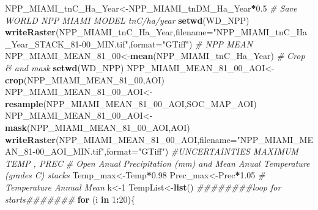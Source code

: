 \documentclass[
  10pt,
  b5paper,
]{book}
\newenvironment{Shaded}{\begin{snugshade}}{\end{snugshade}}
\newcommand{\CommentTok}[1]{\textcolor[rgb]{0.56,0.35,0.01}{\textit{#1}}}
\newcommand{\ControlFlowTok}[1]{\textcolor[rgb]{0.13,0.29,0.53}{\textbf{#1}}}
\newcommand{\DataTypeTok}[1]{\textcolor[rgb]{0.13,0.29,0.53}{#1}}
\newcommand{\DecValTok}[1]{\textcolor[rgb]{0.00,0.00,0.81}{#1}}
\newcommand{\FloatTok}[1]{\textcolor[rgb]{0.00,0.00,0.81}{#1}}
\newcommand{\KeywordTok}[1]{\textcolor[rgb]{0.13,0.29,0.53}{\textbf{#1}}}
\newcommand{\NormalTok}[1]{#1}
\newcommand{\OperatorTok}[1]{\textcolor[rgb]{0.81,0.36,0.00}{\textbf{#1}}}
\newcommand{\StringTok}[1]{\textcolor[rgb]{0.31,0.60,0.02}{#1}}
\begin{document}
\begin{Shaded}
\begin{Highlighting}[]
\NormalTok{NPP_MIAMI_tnC_Ha_Year<-NPP_MIAMI_tnDM_Ha_Year}\OperatorTok{*}\FloatTok{0.5}
\CommentTok{# Save WORLD NPP MIAMI MODEL tnC/ha/year}
\KeywordTok{setwd}\NormalTok{(WD_NPP)}
\KeywordTok{writeRaster}\NormalTok{(NPP_MIAMI_tnC_Ha_Year,}\DataTypeTok{filename=}\StringTok{"NPP_MIAMI_tnC_Ha_Year_STACK_81-00_MIN.tif"}\NormalTok{,}\DataTypeTok{format=}\StringTok{"GTiff"}\NormalTok{)}
\CommentTok{# NPP MEAN}
\NormalTok{NPP_MIAMI_MEAN_}\DecValTok{81}\NormalTok{_}\DecValTok{00}\NormalTok{<-}\KeywordTok{mean}\NormalTok{(NPP_MIAMI_tnC_Ha_Year)}
\CommentTok{# Crop & and mask}
\KeywordTok{setwd}\NormalTok{(WD_NPP)}
\NormalTok{NPP_MIAMI_MEAN_}\DecValTok{81}\NormalTok{_}\DecValTok{00}\NormalTok{_AOI<-}\KeywordTok{crop}\NormalTok{(NPP_MIAMI_MEAN_}\DecValTok{81}\NormalTok{_}\DecValTok{00}\NormalTok{,AOI)}
\NormalTok{NPP_MIAMI_MEAN_}\DecValTok{81}\NormalTok{_}\DecValTok{00}\NormalTok{_AOI<-}\KeywordTok{resample}\NormalTok{(NPP_MIAMI_MEAN_}\DecValTok{81}\NormalTok{_}\DecValTok{00}\NormalTok{_AOI,SOC_MAP_AOI)}
\NormalTok{NPP_MIAMI_MEAN_}\DecValTok{81}\NormalTok{_}\DecValTok{00}\NormalTok{_AOI<-}\KeywordTok{mask}\NormalTok{(NPP_MIAMI_MEAN_}\DecValTok{81}\NormalTok{_}\DecValTok{00}\NormalTok{_AOI,AOI)}
\KeywordTok{writeRaster}\NormalTok{(NPP_MIAMI_MEAN_}\DecValTok{81}\NormalTok{_}\DecValTok{00}\NormalTok{_AOI,}\DataTypeTok{filename=}\StringTok{"NPP_MIAMI_MEAN_81-00_AOI_MIN.tif"}\NormalTok{,}\DataTypeTok{format=}\StringTok{"GTiff"}\NormalTok{)}
\CommentTok{#UNCERTAINTIES MAXIMUM TEMP , PREC}
\CommentTok{# Open Anual Precipitation (mm) and Mean Anual Temperature (grades C) stacks}
\NormalTok{Temp_max<-Temp}\OperatorTok{*}\FloatTok{0.98}
\NormalTok{Prec_max<-Prec}\OperatorTok{*}\FloatTok{1.05}
\CommentTok{# Temperature Annual Mean }
\NormalTok{k<-}\DecValTok{1}
\NormalTok{TempList<-}\KeywordTok{list}\NormalTok{()}
\CommentTok{########loop for starts#######}
\ControlFlowTok{for}\NormalTok{ (i }\ControlFlowTok{in} \DecValTok{1}\OperatorTok{:}\DecValTok{20}\NormalTok{)\{}


\end{Highlighting}
\end{Shaded}
\end{document}

